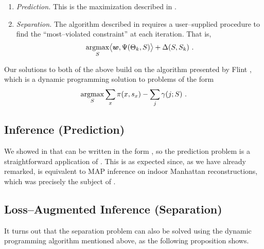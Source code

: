 \begin{enumerate}
  \item{\textit{Prediction.} This is the maximization described in
    .}
  \item{\textit{Separation.} The algorithm described in
    \cite{Tsochantaridis04} requires a user--supplied procedure to
    find the ``most--violated constraint'' at each iteration. That is,
    \begin{equation}
      \operatorname*{argmax}_{S}
        \bigl\langle\boldsymbol{w}, \Psi(\Theta_k,S)\bigr\rangle
        + \Delta(S,S_k) ~.
        \label{eq:separation-problem}
    \end{equation}
  }
\end{enumerate}

Our solutions to both of the above build on the algorithm presented by Flint
\etal \cite{Flint10eccv,Flint11}, which is a dynamic programming
solution to problems of the form
\begin{equation}
  \operatorname*{argmax}_{S}
  \sum_x \pi(x,s_x) - \sum_j \gamma(j;S) ~.
  \label{eq:inference-problem}
\end{equation}

\subsection{Inference (Prediction)}

We showed in  that  can be
written in the form , so the prediction
problem is a straightforward application of \cite{Flint10eccv}. This
is as expected since, as we have already remarked,
 is equivalent to MAP inference on indoor
Manhattan reconstructions, which was precisely the subject
of \cite{Flint10eccv}.

\subsection{Loss--Augmented Inference (Separation)}

It turns out that the separation problem can also be solved using the
dynamic programming algorithm mentioned above, as the following
proposition shows.

